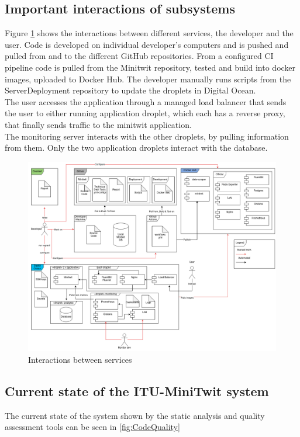\subsection{Important interactions of subsystems}
Figure \ref{fig:interactions} shows the interactions between different services, the developer and the user. Code is developed on individual developer's computers and is pushed and pulled from and to the different GitHub repositories. From a configured CI pipeline code is pulled from the Minitwit repository, tested and build into docker images, uploaded to Docker Hub. The developer manually runs scripts from the ServerDeployment repository to update the droplets in Digital Ocean.\\
The user accesses the application through a managed load balancer that sends the user to either running application droplet, which each has a reverse proxy, that finally sends traffic to the minitwit application.\\
The monitoring server interacts with the other droplets, by pulling information from them. Only the two application droplets interact with the database.
\begin{figure}[H]
    \centering
    \includegraphics[width=\linewidth]{images/diagrams/Interactions.png}
    \caption{Interactions between services}
    \label{fig:interactions}
\end{figure}


\subsection{Current state of the ITU-MiniTwit system}
The current state of the system shown by the static analysis and quality assessment tools can be seen in \autoref{fig:CodeQuality}


